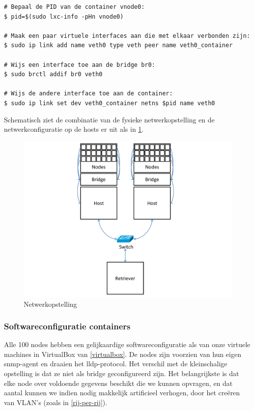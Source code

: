 \begin{lstlisting}[caption={Linux containers verbinden met een bridge\cite{lxc-config}}]
# Bepaal de PID van de container vnode0:
$ pid=$(sudo lxc-info -pHn vnode0)

# Maak een paar virtuele interfaces aan die met elkaar verbonden zijn:
$ sudo ip link add name veth0 type veth peer name veth0_container

# Wijs een interface toe aan de bridge br0:
$ sudo brctl addif br0 veth0

# Wijs de andere interface toe aan de container:
$ sudo ip link set dev veth0_container netns $pid name veth0
\end{lstlisting}

Schematisch ziet de combinatie van de fysieke netwerkopstelling en de netwerkconfiguratie op de hosts er uit als in \cref{fig-vwall-opstelling}.

\begin{figure}[h]
	\centering
	\includegraphics[scale=0.50]{figures/virtual-wall-opstelling}
	\caption{Netwerkopstelling \vwall{}}
	\label{fig-vwall-opstelling}
\end{figure}



\subsubsection{Softwareconfiguratie containers}

Alle 100 nodes hebben een gelijkaardige softwareconfiguratie als van onze virtuele machines in VirtualBox van \cref{virtualbox}.
De nodes zijn voorzien van hun eigen \gls{snmp-agent} en draaien het \gls{lldp}-protocol.
Het verschil met de kleinschalige opstelling is dat ze niet als bridge geconfigureerd zijn.
Het belangrijkste is dat elke node over voldoende gegevens beschikt die we kunnen opvragen,
en dat aantal kunnen we indien nodig makkelijk artificieel verhogen, door het creëren van VLAN's (zoals in \cref{rij-per-rij}).


